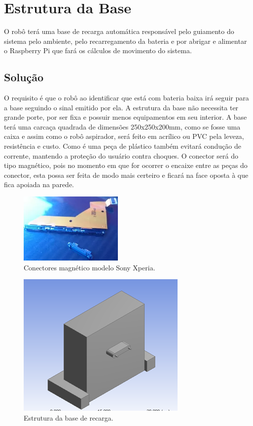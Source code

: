 
\section{Estrutura da Base} %
\label{sec:estrutura_da_base}
	
	O robô terá uma base de recarga automática responsável pelo guiamento do sistema pelo ambiente, pelo recarregamento da bateria e por abrigar e alimentar o Raspberry Pi que fará os cálculos de movimento do sistema.

	\subsection{Solução} %
	\label{sub:solução}
		
		O requisito é que o robô ao identificar que está com bateria baixa irá seguir para a base seguindo o sinal emitido por ela. A estrutura da base não necessita ter grande porte, por ser fixa e possuir menos equipamentos em seu interior. A base terá uma carcaça quadrada de dimensões 250x250x200mm, como se fosse uma caixa e assim como o robô aspirador, será feito em acrílico ou PVC pela leveza, resistência e custo. Como é uma peça de plástico também evitará condução de corrente, mantendo a proteção do usuário contra choques.  O conector será do tipo magnético, pois no momento em que for ocorrer o encaixe entre as peças do conector, esta possa ser feita de modo mais certeiro e ficará na face oposta à que fica apoiada na parede.

		\begin{figure}[H]
			\centering
			\includegraphics[scale=0.8]{figuras/conector_mag.png}
			\caption{Conectores magnético modelo Sony Xperia.}
			\label{img:conectores}
		\end{figure}

		\begin{figure}[H]
			\centering
			\includegraphics[scale=0.8]{figuras/estrutura_base.png}
			\caption{Estrutura da base de recarga.}
			\label{img:estrutura_base}
		\end{figure}	

